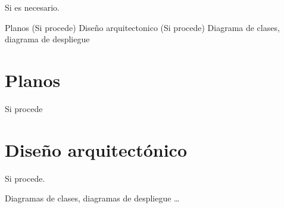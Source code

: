 
Si es necesario.


    Planos (Si procede)
    Diseño arquitectonico (Si procede)
        Diagrama de clases, diagrama de despliegue

\section{Planos}

Si procede

\section{Diseño arquitectónico}

Si procede.

Diagramas de clases, diagramas de despliegue \ldots

